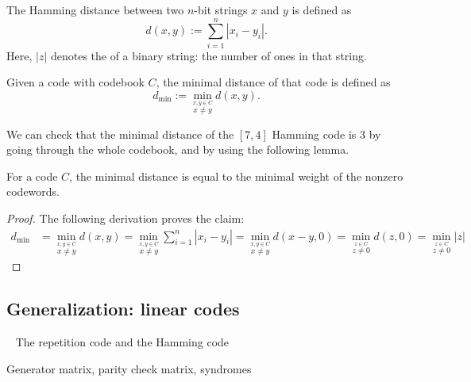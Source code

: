 \begin{definition}
The Hamming distance between two $n$-bit strings $x$ and $y$ is defined as
\[
d(x,y) := \sum_{i=1}^n |x_i - y_i|.
\]
Here, $|z|$ denotes the  of a binary string: the number of ones in that string.
\end{definition}

\begin{definition}
Given a code with codebook $C$, the minimal distance of that code is defined as
\[
d_{\min} := \min_{\stackrel{x,y \in C}{x \neq y}} d(x,y).
\]
\end{definition}
We can check that the minimal distance of the $[7,4]$ Hamming code is 3 by going through the whole codebook, and by using the following lemma.

\begin{proposition}
For a code $C$, the minimal distance is equal to the minimal weight of the nonzero codewords.
\end{proposition}
\begin{proof}
The following derivation proves the claim:
\begin{align}
d_{\min} &= \min_{\stackrel{x,y \in C}{x \neq y}} d(x,y) 
= \min_{\stackrel{x,y \in C}{x \neq y}} \sum_{i=1}^n |x_i - y_i| 
= \min_{\stackrel{x,y \in C}{x \neq y}} d(x-y,0)
= \min_{\stackrel{z \in C}{z \neq 0}} d(z,0)
= \min_{\stackrel{z \in C}{z \neq 0}} |z|
\end{align}
\end{proof}




\subsection{Generalization: linear codes}~\label{sec:linear-codes}
The repetition code and the Hamming code 

Generator matrix, parity check matrix, syndromes